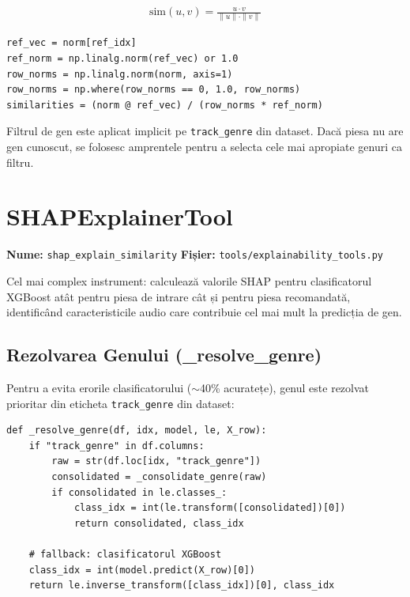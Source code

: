 \documentclass[12pt,a4paper]{report}
\begin{document}
\begin{align}
\text{sim}(u, v) = \frac{u \cdot v}{\|u\| \cdot \|v\|}
\end{align}

\begin{lstlisting}[style=python, caption={Căutarea vectorizată a pieselor similare}]
ref_vec = norm[ref_idx]
ref_norm = np.linalg.norm(ref_vec) or 1.0
row_norms = np.linalg.norm(norm, axis=1)
row_norms = np.where(row_norms == 0, 1.0, row_norms)
similarities = (norm @ ref_vec) / (row_norms * ref_norm)
\end{lstlisting}

Filtrul de gen este aplicat implicit pe \texttt{track\_genre} din dataset.
Dacă piesa nu are gen cunoscut, se folosesc amprentele pentru a selecta
cele mai apropiate genuri ca filtru.

\section{SHAPExplainerTool}

\textbf{Nume:} \texttt{shap\_explain\_similarity} \quad
\textbf{Fișier:} \texttt{tools/explainability\_tools.py}

Cel mai complex instrument: calculează valorile SHAP pentru clasificatorul
XGBoost atât pentru piesa de intrare cât și pentru piesa recomandată,
identificând caracteristicile audio care contribuie cel mai mult la predicția
de gen.

\subsection{Rezolvarea Genului (\_resolve\_genre)}

Pentru a evita erorile clasificatorului ($\sim$40\% acuratețe), genul este
rezolvat prioritar din eticheta \texttt{track\_genre} din dataset:

\begin{lstlisting}[style=python, caption={\_resolve\_genre() — dataset-first, XGBoost fallback}]
def _resolve_genre(df, idx, model, le, X_row):
    if "track_genre" in df.columns:
        raw = str(df.loc[idx, "track_genre"])
        consolidated = _consolidate_genre(raw)
        if consolidated in le.classes_:
            class_idx = int(le.transform([consolidated])[0])
            return consolidated, class_idx

    # fallback: clasificatorul XGBoost
    class_idx = int(model.predict(X_row)[0])
    return le.inverse_transform([class_idx])[0], class_idx
\end{lstlisting}
\end{document}
